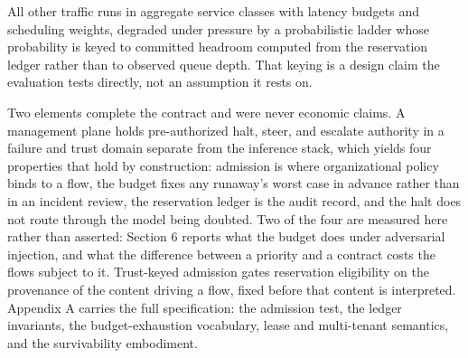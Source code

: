 All other traffic runs in aggregate service classes with latency budgets
and scheduling weights, degraded under pressure by a probabilistic ladder
whose probability is keyed to committed headroom computed from the
reservation ledger rather than to observed queue depth. That keying is a
design claim the evaluation tests directly, not an assumption it rests
on.

Two elements complete the contract and were never economic claims. A
management plane holds pre-authorized halt, steer, and escalate
authority in a failure and trust domain separate from the inference
stack, which yields four properties that hold by construction: admission
is where organizational policy binds to a flow, the budget fixes any
runaway's worst case in advance rather than in an incident review, the
reservation ledger is the audit record, and the halt does not route
through the model being doubted. Two of the four are measured here
rather than asserted: Section 6 reports what the budget does under
adversarial injection, and what the difference between a priority and a
contract costs the flows subject to it. Trust-keyed admission gates
reservation eligibility on the provenance of the content driving a flow,
fixed before that content is interpreted. Appendix A carries the full
specification: the admission test, the ledger invariants, the
budget-exhaustion vocabulary, lease and multi-tenant semantics, and the
survivability embodiment.
